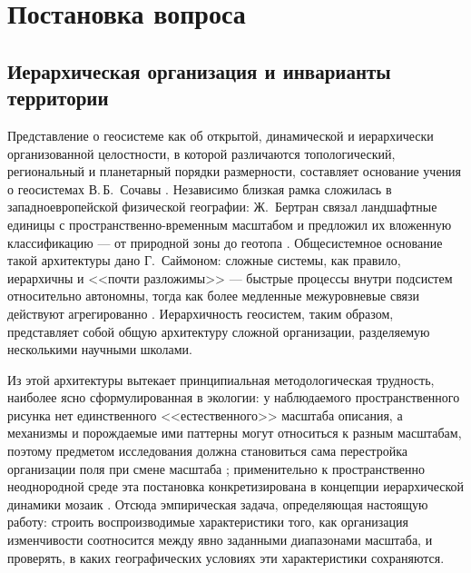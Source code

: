 \documentclass[11pt,a4paper]{article}
\begin{document}
\section{Постановка вопроса}
\label{sec:intro}

\subsection{Иерархическая организация и инварианты территории}

Представление о геосистеме как об открытой, динамической и иерархически организованной целостности, в которой различаются топологический, региональный и планетарный порядки размерности, составляет основание учения о геосистемах В.\,Б.~Сочавы \cite{Sochava1978}. Независимо близкая рамка сложилась в западноевропейской физической географии: Ж.~Бертран связал ландшафтные единицы с пространственно-временным масштабом и предложил их вложенную классификацию --- от природной зоны до геотопа \cite{Bertrand1968}. Общесистемное основание такой архитектуры дано Г.~Саймоном: сложные системы, как правило, иерархичны и <<почти разложимы>> --- быстрые процессы внутри подсистем относительно автономны, тогда как более медленные межуровневые связи действуют агрегированно \cite{Simon1962}. Иерархичность геосистем, таким образом, представляет собой общую архитектуру сложной организации, разделяемую несколькими научными школами.

Из этой архитектуры вытекает принципиальная методологическая трудность, наиболее ясно сформулированная в экологии: у наблюдаемого пространственного рисунка нет единственного <<естественного>> масштаба описания, а механизмы и порождаемые ими паттерны могут относиться к разным масштабам, поэтому предметом исследования должна становиться сама перестройка организации поля при смене масштаба \cite{Levin1992}; применительно к пространственно неоднородной среде эта постановка конкретизирована в концепции иерархической динамики мозаик \cite{WuLoucks1995}. Отсюда эмпирическая задача, определяющая настоящую работу: строить воспроизводимые характеристики того, как организация изменчивости соотносится между явно заданными диапазонами масштаба, и проверять, в каких географических условиях эти характеристики сохраняются.
\end{document}
